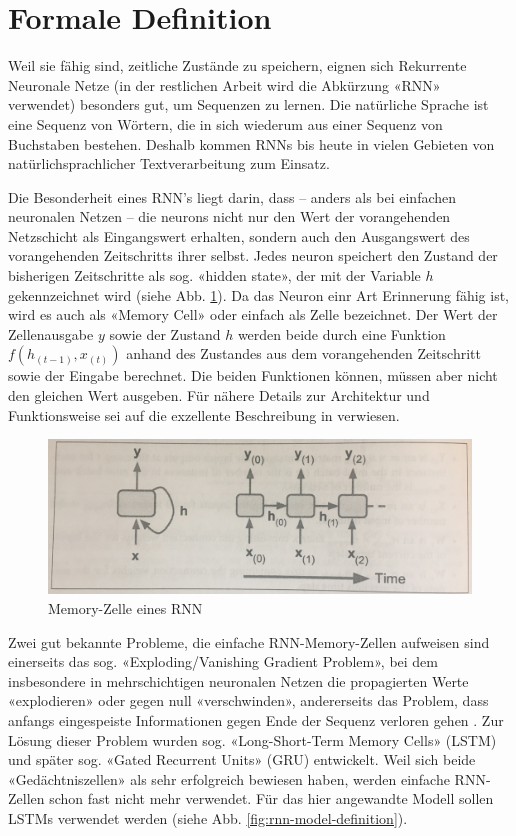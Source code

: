 \section{Formale Definition}
\label{sec:model-definition}

Weil sie fähig sind, zeitliche Zustände zu speichern, eignen sich Rekurrente Neuronale Netze (in der restlichen Arbeit wird die Abkürzung «RNN» verwendet) besonders gut, um Sequenzen zu lernen.
Die natürliche Sprache ist eine Sequenz von Wörtern, die in sich wiederum aus einer Sequenz von Buchstaben bestehen.
Deshalb kommen RNNs bis heute in vielen Gebieten von natürlichsprachlicher Textverarbeitung zum Einsatz.

Die Besonderheit eines RNN's liegt darin, dass – anders als bei einfachen neuronalen Netzen – die \glspl{neuron} nicht nur den Wert der vorangehenden Netzschicht als
Eingangswert erhalten, sondern auch den Ausgangswert des vorangehenden Zeitschritts ihrer selbst.
Jedes \gls{neuron} speichert den Zustand der bisherigen Zeitschritte als sog. «hidden state», der mit der Variable $ h $ gekennzeichnet wird (siehe Abb. \ref{fig:rnn-model-definition-memory-cell}).
Da das Neuron einr Art Erinnerung fähig ist, wird es auch als «Memory Cell» oder einfach als Zelle bezeichnet.
Der Wert der Zellenausgabe $ y $ sowie der Zustand $ h $ werden beide durch eine Funktion $ f(h_{(t-1)}, x_{(t)})$ anhand des Zustandes aus dem vorangehenden Zeitschritt sowie der Eingabe berechnet.
Die beiden Funktionen können, müssen aber nicht den gleichen Wert ausgeben.
Für nähere Details zur Architektur und Funktionsweise sei auf die exzellente Beschreibung in \autocite{geron} verwiesen.

\begin{figure}
    \centering
    \includegraphics[width=0.75\linewidth]{images/model/model-rnn-definition.jpg}
    \caption[RNN Modell]{Memory-Zelle eines RNN \autocite{geron}}
    \label{fig:rnn-model-definition-memory-cell}
\end{figure}

Zwei gut bekannte Probleme, die einfache RNN-Memory-Zellen aufweisen sind einerseits das sog. «Exploding/Vanishing Gradient Problem», bei dem insbesondere in mehrschichtigen neuronalen Netzen
die propagierten Werte «explodieren» oder gegen null «verschwinden», andererseits das Problem, dass anfangs eingespeiste Informationen gegen Ende der Sequenz verloren gehen \autocite{geron}.
Zur Lösung dieser Problem wurden sog. «Long-Short-Term Memory Cells» (LSTM)\autocite{lstm} und später sog. «Gated Recurrent Units» (GRU)\autocite{gru} entwickelt.
Weil sich beide «Gedächtniszellen» als sehr erfolgreich bewiesen haben, werden einfache RNN-Zellen schon fast nicht mehr verwendet.
Für das hier angewandte Modell sollen LSTMs verwendet werden (siehe Abb. \ref{fig:rnn-model-definition}).

